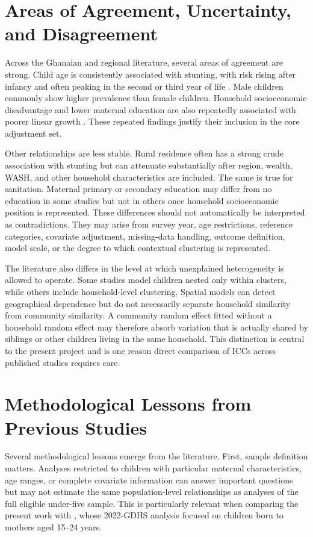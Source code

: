 \section{Areas of Agreement, Uncertainty, and Disagreement}

Across the Ghanaian and regional literature, several areas of agreement are strong. Child age is consistently associated with stunting, with risk rising after infancy and often peaking in the second or third year of life \cite{AkombiEtAl2017,TakeleEtAl2022,MoloroEtAl2026}. Male children commonly show higher prevalence than female children. Household socioeconomic disadvantage and lower maternal education are also repeatedly associated with poorer linear growth \cite{AhetoEtAl2015,AgyenEtAl2024,SeworJayalakshmi2024,MoloroEtAl2026}. These repeated findings justify their inclusion in the core adjustment set.

Other relationships are less stable. Rural residence often has a strong crude association with stunting but can attenuate substantially after region, wealth, WASH, and other household characteristics are included. The same is true for sanitation. Maternal primary or secondary education may differ from no education in some studies but not in others once household socioeconomic position is represented. These differences should not automatically be interpreted as contradictions. They may arise from survey year, age restrictions, reference categories, covariate adjustment, missing-data handling, outcome definition, model scale, or the degree to which contextual clustering is represented.

The literature also differs in the level at which unexplained heterogeneity is allowed to operate. Some studies model children nested only within clusters, while others include household-level clustering. Spatial models can detect geographical dependence but do not necessarily separate household similarity from community similarity. A community random effect fitted without a household random effect may therefore absorb variation that is actually shared by siblings or other children living in the same household. This distinction is central to the present project and is one reason direct comparison of ICCs across published studies requires care.

\section{Methodological Lessons from Previous Studies}

Several methodological lessons emerge from the literature. First, sample definition matters. Analyses restricted to children with particular maternal characteristics, age ranges, or complete covariate information can answer important questions but may not estimate the same population-level relationships as analyses of the full eligible under-five sample. This is particularly relevant when comparing the present work with \citet{OgumEtAl2026}, whose 2022-GDHS analysis focused on children born to mothers aged 15--24 years.


